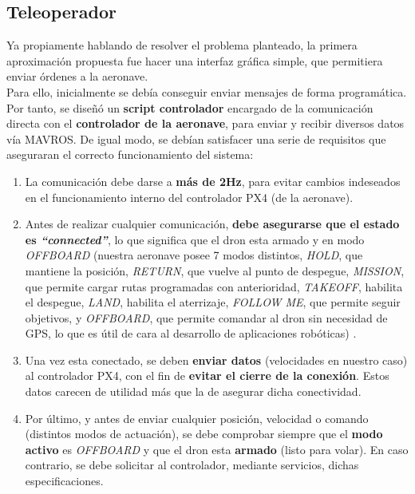 \subsection{Teleoperador}
\label{subsec:teleoperador}

Ya propiamente hablando de resolver el problema planteado, la primera aproximación propuesta fue hacer una interfaz gráfica simple, que permitiera enviar órdenes a la aeronave.\\

Para ello, inicialmente se debía conseguir enviar mensajes de forma programática. Por tanto, se diseñó un \textbf{script controlador} encargado de la comunicación directa con el \textbf{controlador de la aeronave}, para enviar y recibir diversos datos vía MAVROS. De igual modo, se debían satisfacer una serie de requisitos que aseguraran el correcto funcionamiento del sistema:

\begin{enumerate}
	\item La comunicación debe darse a \textbf{más de 2Hz}, para evitar cambios indeseados en el funcionamiento interno del controlador PX4 (de la aeronave).

	\item Antes de realizar cualquier comunicación, \textbf{debe asegurarse que el estado es \emph{``connected''}}, lo que significa que el dron esta armado y en modo \emph{OFFBOARD} (nuestra aeronave posee 7 modos distintos, \emph{HOLD}, que mantiene la posición, \emph{RETURN}, que vuelve al punto de despegue, \emph{MISSION}, que permite cargar rutas programadas con anterioridad, \emph{TAKEOFF}, habilita el despegue, \emph{LAND}, habilita el aterrizaje, \emph{FOLLOW ME}, que permite seguir objetivos, y \emph{OFFBOARD}, que permite comandar al dron sin necesidad de GPS, lo que es útil de cara al desarrollo de aplicaciones robóticas) \cite{flight-modes}.
	
    \item Una vez esta conectado, se deben \textbf{enviar datos} (velocidades en nuestro caso) al controlador PX4, con el fin de \textbf{evitar el cierre de la conexión}. Estos datos carecen de utilidad más que la de asegurar dicha conectividad.
    
    \item Por último, y antes de enviar cualquier posición, velocidad o comando (distintos modos de actuación), se debe comprobar siempre que el \textbf{modo activo} es \emph{OFFBOARD} y que el dron esta \textbf{armado} (listo para volar). En caso contrario, se debe solicitar al controlador, mediante servicios, dichas especificaciones.
\end{enumerate}

